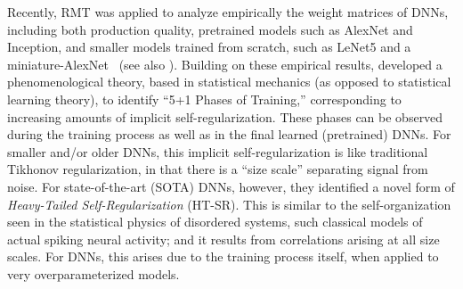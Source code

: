 \documentclass{article}
\begin{document}
Recently, RMT was applied to analyze empirically the weight matrices of DNNs, including both production quality, pretrained models such as AlexNet and Inception, and smaller models trained from scratch, such as LeNet5 and a miniature-AlexNet~\citep{MM18_TR} (see also \citep{MM17_TR, MM18_TR, MM19_HTSR_ICML, MM20_SDM, MM19_KDD}).
Building on these empirical results, 
\citet{MM18_TR} developed a phenomenological theory, based in statistical mechanics (as opposed to statistical learning theory), to identify ``5+1 Phases of Training,'' 
corresponding to increasing amounts of implicit self-regularization.
These phases can be observed during the training process as well as in the final learned (pretrained) DNNs.
For smaller and/or older DNNs, this implicit self-regularization is like traditional Tikhonov regularization, in that there is a ``size scale'' separating signal from noise.
For state-of-the-art (SOTA) DNNs, however, they identified a novel form of \emph{Heavy-Tailed Self-Regularization} (HT-SR).
This is similar to the self-organization seen in the statistical physics of disordered systems, such classical models of actual spiking neural activity; and 
it results from correlations arising at all size scales.
For DNNs, this arises due to the training process itself, when applied to very overparameterized models.
\end{document}
